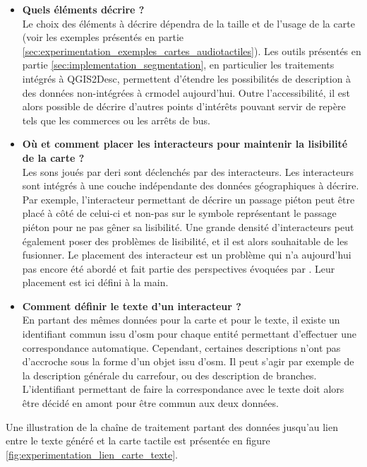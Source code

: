 \begin{itemize}
    \item \textbf{Quels éléments décrire ?} \\
    Le choix des éléments à décrire dépendra de la taille et de l'usage de la carte (voir les exemples présentés en partie \ref{sec:experimentation_exemples_cartes_audiotactiles}). Les outils présentés en partie \ref{sec:implementation_segmentation}, en particulier les traitements intégrés à QGIS2Desc, permettent d'étendre les possibilités de description à des données non-intégrées à crmodel aujourd'hui. Outre l'accessibilité, il est alors possible de décrire d'autres points d'intérêts pouvant servir de repère tels que les commerces ou les arrêts de bus.
    \item \textbf{Où et comment placer les interacteurs pour maintenir la lisibilité de la carte ?} \\
    Les sons joués par \gls{deri} sont déclenchés par des interacteurs. Les interacteurs sont intégrés à une couche indépendante des données géographiques à décrire. Par exemple, l'interacteur permettant de décrire un passage piéton peut être placé à côté de celui-ci et non-pas sur le symbole représentant le passage piéton pour ne pas gêner sa lisibilité. Une grande densité d'interacteurs peut également poser des problèmes de lisibilité, et il est alors souhaitable de les fusionner. Le placement des interacteur est un problème qui n'a aujourd'hui pas encore été abordé et fait partie des perspectives évoquées par \citet{Jiang2023}. Leur placement est ici défini à la main.
    \item \textbf{Comment définir le texte d'un interacteur ?} \\
    En partant des mêmes données pour la carte et pour le texte, il existe un identifiant commun issu d'\gls{osm} pour chaque entité  permettant d'effectuer une correspondance automatique. Cependant, certaines descriptions n'ont pas d'accroche sous la forme d'un objet issu d'\gls{osm}. Il peut s'agir par exemple de la description générale du carrefour, ou des description de branches. L'identifiant permettant de faire la correspondance avec le texte doit alors être décidé en amont pour être commun aux deux données.
\end{itemize}

\newpar{}

Une illustration de la chaîne de traitement partant des données jusqu'au lien entre le texte généré et la carte tactile est présentée en figure \ref{fig:experimentation_lien_carte_texte}.

